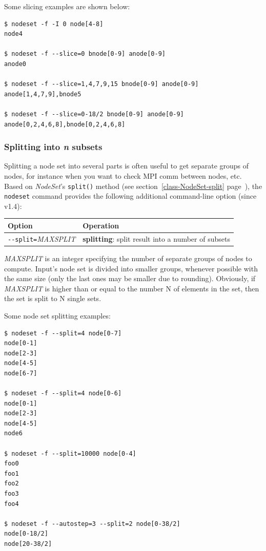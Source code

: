 \documentclass[english,a4paper]{csuserguide}
\newcommand{\NodeSet}{\textit{NodeSet}\xspace}
\newcommand{\nodeset}{\texttt{nodeset}\xspace}
\begin{document}
Some slicing examples are shown below:
\medskip
\begin{lstlisting}[breaklines=true, breakatwhitespace=true]
$ nodeset -f -I 0 node[4-8]
node4

$ nodeset -f --slice=0 bnode[0-9] anode[0-9]
anode0

$ nodeset -f --slice=1,4,7,9,15 bnode[0-9] anode[0-9]
anode[1,4,7,9],bnode5

$ nodeset -f --slice=0-18/2 bnode[0-9] anode[0-9]
anode[0,2,4,6,8],bnode[0,2,4,6,8]
\end{lstlisting}


\subsubsection{Splitting into \textit{n} subsets}
\label{nodeset-splitting-n}
Splitting a node set into several parts is often useful to get separate groups of nodes, for instance when you want to check MPI comm between nodes, etc. Based on \NodeSet's \lstinline+split()+ method (see section~\ref{class-NodeSet-split} page~\pageref{class-NodeSet-split}), the \nodeset command provides the following additional command-line option (since v1.4):
\begin{center}
\label{nodeset-split}
\begin{tabular}{|p{5.4cm}|p{11.4cm}|} 
\hline 
\textbf{Option} & \textbf{Operation} \\
\hline
\verb+--split=+\textit{MAXSPLIT}& \textbf{splitting}: split result into a number of subsets\\
\hline
\end{tabular}
\end{center}

\textit{MAXSPLIT} is an integer specifying the number of separate groups of nodes to compute. Input's node set is divided into smaller groups, whenever possible with the same size (only the last ones may be smaller due to rounding). Obviously, if \mbox{\textit{MAXSPLIT}} is higher than or equal to the number N of elements in the set, then the set is split to N single sets.

\newpage
Some node set splitting examples:
\medskip
\begin{lstlisting}[breaklines=true, breakatwhitespace=true]
$ nodeset -f --split=4 node[0-7]
node[0-1]
node[2-3]
node[4-5]
node[6-7]

$ nodeset -f --split=4 node[0-6]
node[0-1]
node[2-3]
node[4-5]
node6

$ nodeset -f --split=10000 node[0-4]
foo0
foo1
foo2
foo3
foo4

$ nodeset -f --autostep=3 --split=2 node[0-38/2]
node[0-18/2]
node[20-38/2]
\end{lstlisting}
\end{document}
